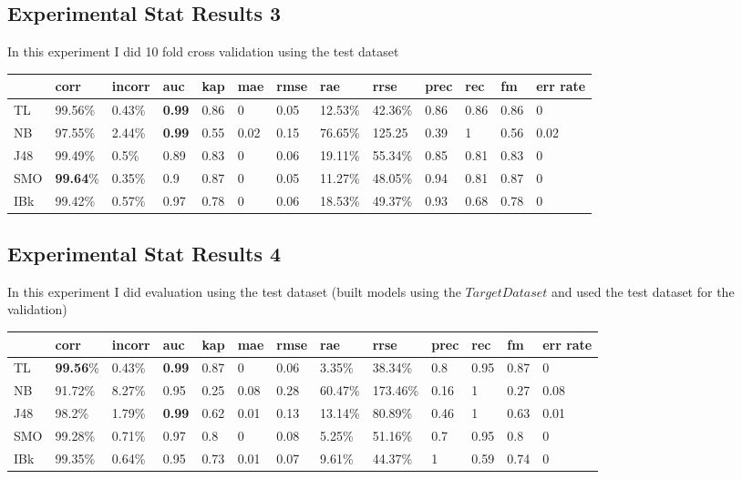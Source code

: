 \documentclass[a4paper,12pt, english]{article}
\begin{document}
\subsection{Experimental Stat Results 3}
In this experiment I did 10 fold cross validation using the test dataset
\begin{small}
\begin{center}
    \begin{tabular}{ | l | l | l | l | l | l | l | l | l | l | l | l | l |}
    \hline
& corr & incorr  & auc & kap & mae & rmse & rae & rrse & prec & rec & fm & err rate\\ \hline    
TL & 99.56\% & 0.43\% & \textbf{0.99} & 0.86 & 0 & 0.05 & 12.53\% & 42.36\% & 0.86 & 0.86 & 0.86 & 0\\ \hline
NB & 97.55\% & 2.44\% & \textbf{0.99} & 0.55 & 0.02 & 0.15 & 76.65\% & 125.25 & 0.39 & 1 & 0.56 & 0.02\\ \hline
J48 & 99.49\% & 0.5\% & 0.89 & 0.83 & 0 & 0.06 & 19.11\% & 55.34\% & 0.85 & 0.81 & 0.83 & 0\\ \hline
SMO & \textbf{99.64}\% & 0.35\% & 0.9 & 0.87 & 0 & 0.05 & 11.27\% & 48.05\% & 0.94 & 0.81 & 0.87 & 0\\ \hline
IBk & 99.42\% & 0.57\% & 0.97 & 0.78 & 0 & 0.06 & 18.53\% & 49.37\% & 0.93 & 0.68 & 0.78 & 0\\ \hline      
    
    \end{tabular}       
\end{center}
\end{small}

\subsection{Experimental Stat Results 4}
In this experiment I did evaluation using the test dataset (built models using the $Target Dataset$ and used the test dataset for the validation)
\begin{small}
\begin{center}
    \begin{tabular}{ | l | l | l | l | l | l | l | l | l | l | l | l | l |}
    \hline
	& corr & incorr  & auc & kap & mae & rmse & rae & rrse & prec & rec & fm & err rate\\ \hline    
	TL & \textbf{99.56}\% & 0.43\% & \textbf{0.99} & 0.87 & 0 & 0.06 & 3.35\% & 38.34\% & 0.8 & 0.95 & 0.87 & 0\\ \hline  
	NB & 91.72\% & 8.27\% & 0.95 & 0.25 & 0.08 & 0.28 & 60.47\% & 173.46\% & 0.16 & 1 & 0.27 & 0.08\\ \hline  
	J48 & 98.2\% & 1.79\% & \textbf{0.99} & 0.62 & 0.01 & 0.13 & 13.14\% & 80.89\% & 0.46 & 1 & 0.63 & 0.01\\ \hline  
	SMO & 99.28\% & 0.71\% & 0.97 & 0.8 & 0 & 0.08 & 5.25\% & 51.16\% & 0.7 & 0.95 & 0.8 & 0\\ \hline  
	IBk & 99.35\% & 0.64\% & 0.95 & 0.73 & 0.01 & 0.07 & 9.61\% & 44.37\% & 1 & 0.59 & 0.74 & 0 \\ \hline   		    
    \end{tabular}       
\end{center}
\end{small}
\end{document}
